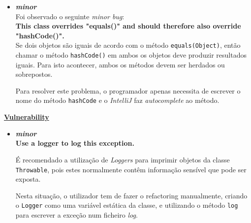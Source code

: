 \documentclass[a4paper]{report}
\begin{document}
\begin{itemize}
        
    \item \textit{\textbf{minor}}\\
        Foi observado o seguinte \textit{minor bug}:\\
        \textbf{This class overrides "equals()" and should therefore also override "hashCode()".}\\
        
        Se dois objetos são iguais de acordo com o método \texttt{equals(Object)}, então chamar o método \texttt{hashCode()} em ambos os objetos deve produzir resultados iguais.
        Para isto acontecer, ambos os métodos devem ser herdados ou sobrepostos.
        
        Para resolver este problema, o programador apenas necessita de escrever o nome do método \texttt{hashCode} e o \textit{IntelliJ} faz \textit{autocomplete} ao método.
\end{itemize}

\underline{\textbf{Vulnerability}}
\begin{itemize}
    \item \textit{\textbf{minor}}\\
    \textbf{Use a logger to log this exception.}
    
    É recomendado a utilização de \textit{Loggers} para imprimir objetos da classe \texttt{Throwable}, pois estes normalmente contêm informação sensível que pode ser exposta.
    
    Nesta situação, o utilizador tem de fazer o refactoring manualmente, criando o \texttt{Logger} como uma variável estática da classe, e utilizando o método \texttt{log} para escrever a exceção num ficheiro \textit{log}.\\
\end{itemize}
\end{document}
